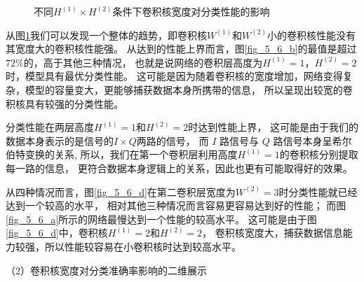\begin{figure}[!h]
	\caption{不同$H^{(1)} \times H^{(2)}$条件下卷积核宽度对分类性能的影响}
	\label{fig_5_6}
\end{figure}

从图\ref{fig_5_6}我们可以发现一个整体的趋势，即卷积核$W^{(1)}$和$W^{(2)}$小的卷积核性能没有其宽度大的卷积核性能强。
从达到的性能上界而言，图\ref{fig_5_6_b}的最值是超过$72\%$的，高于其他三种情况，
也就是说网络的卷积层高度为$H^{(1)} = 1$，$H^{(2)} = 2$时，模型具有最优分类性能。
这可能是因为随着卷积核的宽度增加，网络变得复杂，模型的容量变大，更能够捕获数据本身所携带的信息，
所以呈现出较宽的卷积核具有较强的分类性能。\par

分类性能在两层高度$H^{(1)}=1$和$H^{(2)}=2$时达到性能上界，
这可能是由于我们的数据本身表示的是信号的$I \times Q$两路的信号，
而 $I$ 路信号与 $Q$ 路信号本身呈希尔伯特变换的关系,
所以，我们在第一个卷积层利用高度$H^{(1)}=1$的卷积核分别提取每一路的信息，
更符合数据本身逻辑上的关系，因此也更有可能取得好的效果。
\par

从四种情况而言，图\ref{fig_5_6_d}在第二卷积层宽度为$W^{(2)}=3$时分类性能就已经达到一个较高的水平，
相对其他三种情况而言容易更容易达到好的性能；
而图\ref{fig_5_6_a}所示的网络最慢达到一个性能的较高水平。
这可能是由于图\ref{fig_5_6_d}中，卷积核$H^{(1)}=2$和$H^{(2)}=2$，
卷积核宽度大，捕获数据信息能力较强，所以性能较容易在小卷积核时达到较高水平。\par

（2）卷积核宽度对分类准确率影响的二维展示\par 

